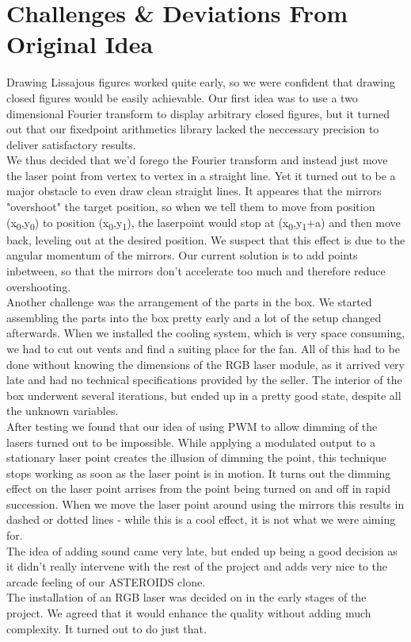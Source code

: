 \documentclass{report}
\begin{document}
\section{Challenges \& Deviations From Original Idea}
Drawing Lissajous figures worked quite early, so we were confident that drawing closed figures would be easily achievable. Our first idea was to use a two dimensional Fourier transform to display arbitrary closed figures, but it turned out that our fixedpoint arithmetics library lacked the neccessary precision to deliver satisfactory results. \\
We thus decided that we'd forego the Fourier transform and instead just move the laser point from vertex to vertex in a straight line. Yet it turned out to be a major obstacle to even draw clean straight lines. It appeares that the mirrors "overshoot" the target position, so when we tell them to move from position (x\textsubscript{0},y\textsubscript{0}) to position (x\textsubscript{0},y\textsubscript{1}), the laserpoint would stop at (x\textsubscript{0},y\textsubscript{1}+a) and then move back, leveling out at the desired position. We suspect that this effect is due to the angular momentum of the mirrors. Our current solution is to add points inbetween, so that the mirrors don't accelerate too much and therefore reduce overshooting. \\
Another challenge was the arrangement of the parts in the box. We started assembling the parts into the box pretty early and a lot of the setup changed afterwards. When we installed the cooling system, which is very space consuming, we had to cut out vents and find a suiting place for the fan. All of this had to be done without knowing the dimensions of the RGB laser module, as it arrived very late and had no technical specifications provided by the seller. The interior of the box underwent several iterations, but ended up in a pretty good state, despite all the unknown variables. \\
After testing we found that our idea of using PWM to allow dimming of the lasers turned out to be impossible. While applying a modulated output to a stationary laser point creates the illusion of dimming the point, this technique stops working as soon as the laser point is in motion. It turns out the dimming effect on the laser point arrises from the point being turned on and off in rapid succession. When we move the laser point around using the mirrors this results in dashed or dotted lines - while this is a cool effect, it is not what we were aiming for. \\
The idea of adding sound came very late, but ended up being a good decision as it didn't really intervene with the rest of the project and adds very nice to the arcade feeling of our ASTEROIDS clone. \\
The installation of an RGB laser was decided on in the early stages of the project. We agreed that it would enhance the quality without adding much complexity. It turned out to do just that.
\end{document}
